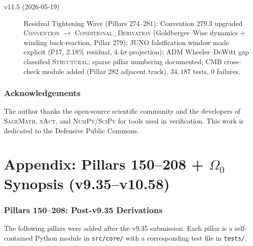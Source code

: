 \documentclass[12pt,a4paper]{article}
\begin{document}
\begin{description}
  \item[v11.5 (2026-05-19)] Residual Tightening Wave (Pillars 274--281):
    Convention 279.3 upgraded \textsc{Convention} $\to$ \textsc{Conditional\_Derivation}
    (Goldberger--Wise dynamics + winding back-reaction, Pillar 279);
    JUNO falsification window made explicit (P17, 2.18\% residual, 4.4$\sigma$ projection);
    ADM Wheeler--DeWitt gap classified \textsc{Structural};
    sparse pillar numbering documented; CMB cross-check module added
    (Pillar 282 adjacent track). $34{,}187$ tests, 0 failures.
\end{description}

\section*{Acknowledgements}

The author thanks the open-source scientific community and the developers of
\textsc{SageMath}, \textsc{xAct}, and \textsc{NumPy}/\textsc{SciPy} for tools
used in verification.  This work is dedicated to the Defensive Public Commons.

\part*{Appendix: Pillars 150--208 + $\Omega_0$ Synopsis (v9.35--v10.58)}

\section*{Pillars 150--208: Post-v9.35 Derivations}
\label{sec:pillars-150-208}

The following pillars were added after the v9.35 submission.  Each pillar
is a self-contained Python module in \texttt{src/core/} with a corresponding
test file in \texttt{tests/}.
\end{document}
